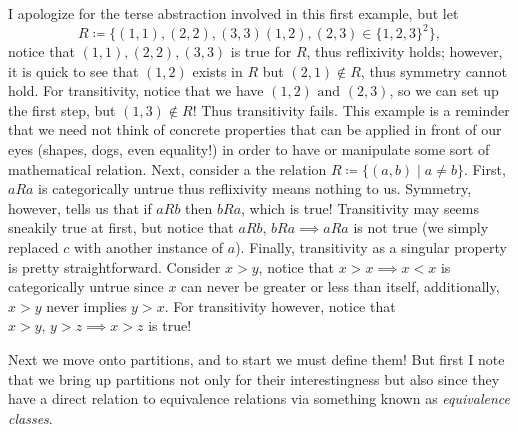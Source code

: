 \documentclass{report}
\begin{document}
\sol I apologize for the terse abstraction involved in this first example, but let \[ R\coloneqq \{(1,1),(2,2),(3,3)(1,2),(2,3)\in \{1,2,3\}^2  \}   ,\] notice that \( (1,1),(2,2),(3,3) \) is true for \( R \), thus reflixivity holds; however, it is quick to see that \( (1,2) \) exists in \( R \) but \( (2,1)\not\in R \), thus symmetry cannot hold. For transitivity, notice that we have \( (1,2) \text{ and }  (2,3)\), so we can set up the first step, but \( (1,3)\not\in  R \)! Thus transitivity fails. This example is a reminder that we need not think of concrete properties that can be applied in front of our eyes (shapes, dogs, even equality!) in order to have or manipulate some sort of mathematical relation. Next, consider a the relation \( R\coloneqq \{(a,b)\mid a \neq  b\}   \). First, \( aRa \) is categorically untrue thus reflixivity means nothing to us. Symmetry, however, tells us that if \( aRb \) then \( bRa \), which is true! Transitivity may seems sneakily true at first, but notice that \( aRb, \, bRa \implies aRa \) is not true (we simply replaced \( c \) with another instance of \( a \)). Finally, transitivity as a singular property is pretty straightforward. Consider \( x>y \), notice that \( x>x \implies x<x \) is categorically untrue since \( x \) can never be greater or less than itself, additionally, \( x>y \) never implies \( y>x \). For transitivity however, notice that \(x>y, \, y>z \implies x>z \) is true!


Next we move onto partitions, and to start we must define them! But first I note that we bring up partitions not only for their interestingness but also since they have a direct relation to equivalence relations via something known as \textit{equivalence classes}. 
\end{document}
